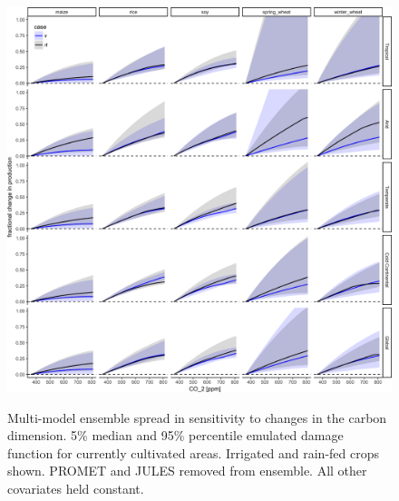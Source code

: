 \documentclass[10pt]{article}
\begin{document}
\begin{figure}[h!]
\includegraphics[width=\textwidth]{s_carbon.png}\\
\caption{Multi-model ensemble spread in sensitivity to changes in the carbon dimension. 5\% median and 95\% percentile emulated damage function for currently cultivated areas. Irrigated and rain-fed crops shown. PROMET and JULES removed from ensemble. All other covariates held constant.}
\label{fig:carbon}
\end{figure}
\end{document}
